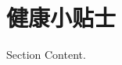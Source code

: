 \documentclass[book.tex]{subfiles}
\begin{document}
\section{健康小贴士}

Section Content.
\end{document}
